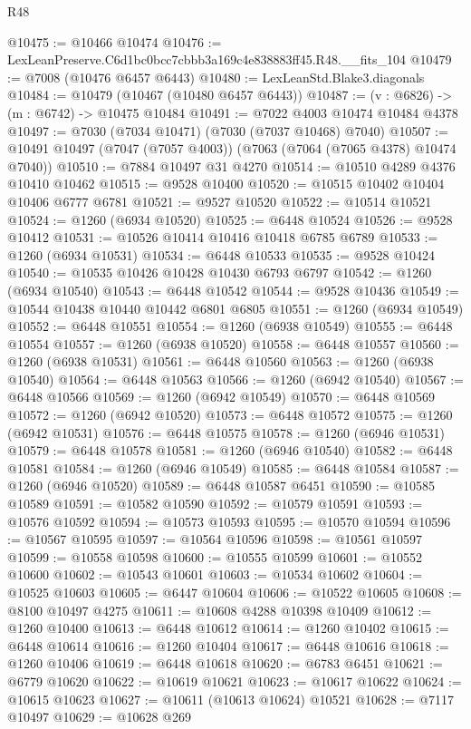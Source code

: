 \begin{lexlean}{R48}
\begin{coremodule}
@10475 := @10466 @10474
@10476 := LexLeanPreserve.C6d1bc0bcc7cbbb3a169c4e838883ff45.R48.__fits_104
@10479 := @7008 (@10476 @6457 @6443)
@10480 := LexLeanStd.Blake3.diagonals
@10484 := @10479 (@10467 (@10480 @6457 @6443))
@10487 := (v : @6826) -> (m : @6742) -> @10475 @10484
@10491 := @7022 @4003 @10474 @10484 @4378
@10497 := @7030 (@7034 @10471) (@7030 (@7037 @10468) @7040)
@10507 := @10491 @10497 (@7047 (@7057 @4003)) (@7063 (@7064 (@7065 @4378) @10474 @7040))
@10510 := @7884 @10497 @31 @4270
@10514 := @10510 @4289 @4376 @10410 @10462
@10515 := @9528 @10400
@10520 := @10515 @10402 @10404 @10406 @6777 @6781
@10521 := @9527 @10520
@10522 := @10514 @10521
@10524 := @1260 (@6934 @10520)
@10525 := @6448 @10524
@10526 := @9528 @10412
@10531 := @10526 @10414 @10416 @10418 @6785 @6789
@10533 := @1260 (@6934 @10531)
@10534 := @6448 @10533
@10535 := @9528 @10424
@10540 := @10535 @10426 @10428 @10430 @6793 @6797
@10542 := @1260 (@6934 @10540)
@10543 := @6448 @10542
@10544 := @9528 @10436
@10549 := @10544 @10438 @10440 @10442 @6801 @6805
@10551 := @1260 (@6934 @10549)
@10552 := @6448 @10551
@10554 := @1260 (@6938 @10549)
@10555 := @6448 @10554
@10557 := @1260 (@6938 @10520)
@10558 := @6448 @10557
@10560 := @1260 (@6938 @10531)
@10561 := @6448 @10560
@10563 := @1260 (@6938 @10540)
@10564 := @6448 @10563
@10566 := @1260 (@6942 @10540)
@10567 := @6448 @10566
@10569 := @1260 (@6942 @10549)
@10570 := @6448 @10569
@10572 := @1260 (@6942 @10520)
@10573 := @6448 @10572
@10575 := @1260 (@6942 @10531)
@10576 := @6448 @10575
@10578 := @1260 (@6946 @10531)
@10579 := @6448 @10578
@10581 := @1260 (@6946 @10540)
@10582 := @6448 @10581
@10584 := @1260 (@6946 @10549)
@10585 := @6448 @10584
@10587 := @1260 (@6946 @10520)
@10589 := @6448 @10587 @6451
@10590 := @10585 @10589
@10591 := @10582 @10590
@10592 := @10579 @10591
@10593 := @10576 @10592
@10594 := @10573 @10593
@10595 := @10570 @10594
@10596 := @10567 @10595
@10597 := @10564 @10596
@10598 := @10561 @10597
@10599 := @10558 @10598
@10600 := @10555 @10599
@10601 := @10552 @10600
@10602 := @10543 @10601
@10603 := @10534 @10602
@10604 := @10525 @10603
@10605 := @6447 @10604
@10606 := @10522 @10605
@10608 := @8100 @10497 @4275
@10611 := @10608 @4288 @10398 @10409
@10612 := @1260 @10400
@10613 := @6448 @10612
@10614 := @1260 @10402
@10615 := @6448 @10614
@10616 := @1260 @10404
@10617 := @6448 @10616
@10618 := @1260 @10406
@10619 := @6448 @10618
@10620 := @6783 @6451
@10621 := @6779 @10620
@10622 := @10619 @10621
@10623 := @10617 @10622
@10624 := @10615 @10623
@10627 := @10611 (@10613 @10624) @10521
@10628 := @7117 @10497
@10629 := @10628 @269

\end{coremodule}
\end{lexlean}
